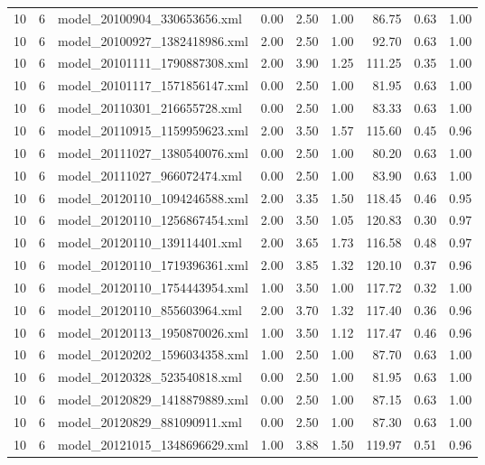 \begin{table}[ht]
\begin{tabular}{rrlrrrrrr}
   10 &   6 & model\_20100904\_330653656.xml & 0.00 & 2.50 & 1.00 & 86.75 & 0.63 & 1.00 \\ 
   10 &   6 & model\_20100927\_1382418986.xml & 2.00 & 2.50 & 1.00 & 92.70 & 0.63 & 1.00 \\ 
   10 &   6 & model\_20101111\_1790887308.xml & 2.00 & 3.90 & 1.25 & 111.25 & 0.35 & 1.00 \\ 
   10 &   6 & model\_20101117\_1571856147.xml & 0.00 & 2.50 & 1.00 & 81.95 & 0.63 & 1.00 \\ 
   10 &   6 & model\_20110301\_216655728.xml & 0.00 & 2.50 & 1.00 & 83.33 & 0.63 & 1.00 \\ 
   10 &   6 & model\_20110915\_1159959623.xml & 2.00 & 3.50 & 1.57 & 115.60 & 0.45 & 0.96 \\ 
   10 &   6 & model\_20111027\_1380540076.xml & 0.00 & 2.50 & 1.00 & 80.20 & 0.63 & 1.00 \\ 
   10 &   6 & model\_20111027\_966072474.xml & 0.00 & 2.50 & 1.00 & 83.90 & 0.63 & 1.00 \\ 
   10 &   6 & model\_20120110\_1094246588.xml & 2.00 & 3.35 & 1.50 & 118.45 & 0.46 & 0.95 \\ 
   10 &   6 & model\_20120110\_1256867454.xml & 2.00 & 3.50 & 1.05 & 120.83 & 0.30 & 0.97 \\ 
   10 &   6 & model\_20120110\_139114401.xml & 2.00 & 3.65 & 1.73 & 116.58 & 0.48 & 0.97 \\ 
   10 &   6 & model\_20120110\_1719396361.xml & 2.00 & 3.85 & 1.32 & 120.10 & 0.37 & 0.96 \\ 
   10 &   6 & model\_20120110\_1754443954.xml & 1.00 & 3.50 & 1.00 & 117.72 & 0.32 & 1.00 \\ 
   10 &   6 & model\_20120110\_855603964.xml & 2.00 & 3.70 & 1.32 & 117.40 & 0.36 & 0.96 \\ 
   10 &   6 & model\_20120113\_1950870026.xml & 1.00 & 3.50 & 1.12 & 117.47 & 0.46 & 0.96 \\ 
   10 &   6 & model\_20120202\_1596034358.xml & 1.00 & 2.50 & 1.00 & 87.70 & 0.63 & 1.00 \\ 
   10 &   6 & model\_20120328\_523540818.xml & 0.00 & 2.50 & 1.00 & 81.95 & 0.63 & 1.00 \\ 
   10 &   6 & model\_20120829\_1418879889.xml & 0.00 & 2.50 & 1.00 & 87.15 & 0.63 & 1.00 \\ 
   10 &   6 & model\_20120829\_881090911.xml & 0.00 & 2.50 & 1.00 & 87.30 & 0.63 & 1.00 \\ 
   10 &   6 & model\_20121015\_1348696629.xml & 1.00 & 3.88 & 1.50 & 119.97 & 0.51 & 0.96 \\ 

\end{tabular}
\end{table}
